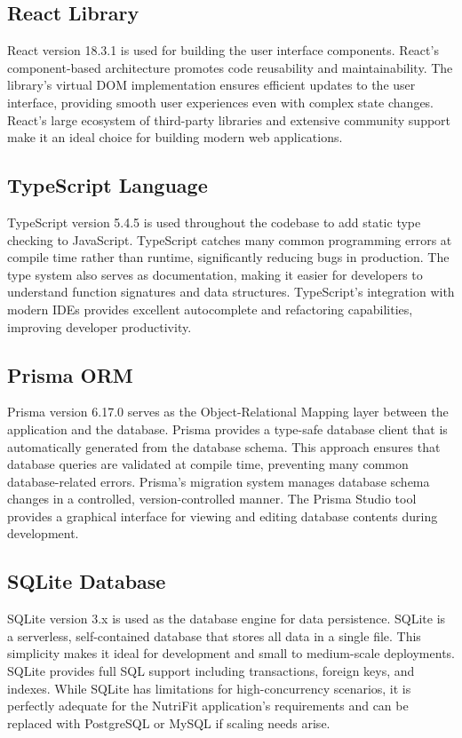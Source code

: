 \subsection{React Library}

React version 18.3.1 is used for building the user interface components. React's component-based architecture promotes code reusability and maintainability. The library's virtual DOM implementation ensures efficient updates to the user interface, providing smooth user experiences even with complex state changes. React's large ecosystem of third-party libraries and extensive community support make it an ideal choice for building modern web applications.

\subsection{TypeScript Language}

TypeScript version 5.4.5 is used throughout the codebase to add static type checking to JavaScript. TypeScript catches many common programming errors at compile time rather than runtime, significantly reducing bugs in production. The type system also serves as documentation, making it easier for developers to understand function signatures and data structures. TypeScript's integration with modern IDEs provides excellent autocomplete and refactoring capabilities, improving developer productivity.

\subsection{Prisma ORM}

Prisma version 6.17.0 serves as the Object-Relational Mapping layer between the application and the database. Prisma provides a type-safe database client that is automatically generated from the database schema. This approach ensures that database queries are validated at compile time, preventing many common database-related errors. Prisma's migration system manages database schema changes in a controlled, version-controlled manner. The Prisma Studio tool provides a graphical interface for viewing and editing database contents during development.

\subsection{SQLite Database}

SQLite version 3.x is used as the database engine for data persistence. SQLite is a serverless, self-contained database that stores all data in a single file. This simplicity makes it ideal for development and small to medium-scale deployments. SQLite provides full SQL support including transactions, foreign keys, and indexes. While SQLite has limitations for high-concurrency scenarios, it is perfectly adequate for the NutriFit application's requirements and can be replaced with PostgreSQL or MySQL if scaling needs arise.

